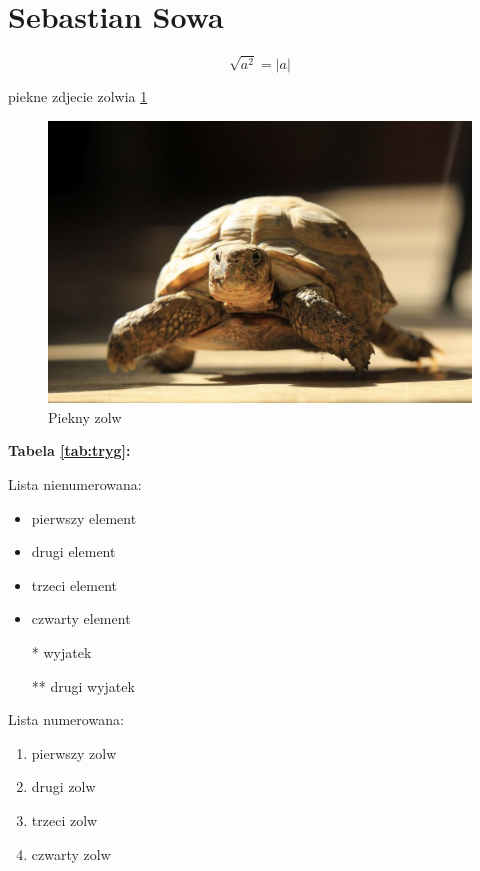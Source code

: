
\newpage
\section{Sebastian Sowa}
\[\sqrt{a^2}=|a|\]

piekne zdjecie zolwia \ref{fig:zolw}

\begin{figure}[htbp]
    
    \centering
   
    \includegraphics[scale=0.3]{pictures/zolw.jpg}
    
    \caption{Piekny zolw}
   
    \label{fig:zolw}
\end{figure}

\vspace{2cm}

\textbf{Tabela \ref{tab:tryg}:}


\vspace{2cm}

Lista nienumerowana:
\begin{itemize}
  \item pierwszy element
  \item drugi element
  \item trzeci element
  \item czwarty element
  \item[*] wyjatek
  \item[**] drugi wyjatek
\end{itemize}

Lista numerowana:
\begin{enumerate}
  \item pierwszy zolw
  \item drugi zolw
  \item trzeci zolw
  \item czwarty zolw
\end{enumerate}

